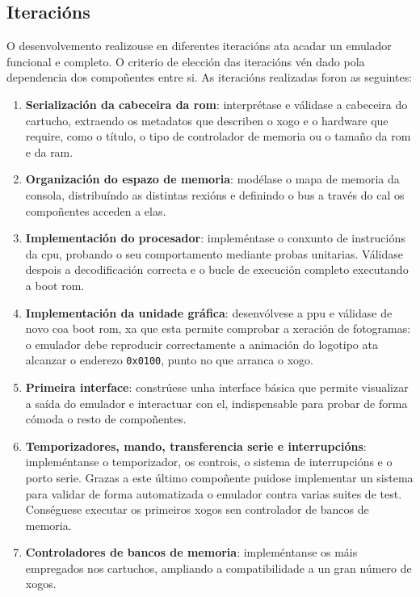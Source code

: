 \subsection{Iteracións}
O desenvolvemento realizouse en diferentes iteracións ata acadar un emulador funcional e completo.
O criterio de elección das iteracións vén dado pola dependencia dos compoñentes entre si.
As iteracións realizadas foron as seguintes:
\begin{enumerate}
    \item \textbf{Serialización da cabeceira da \acrshort{rom}}: interprétase e válidase a cabeceira do cartucho,
    extraendo os metadatos que describen o xogo e o hardware que require, como o título,
    o tipo de controlador de memoria ou o tamaño da \acrshort{rom} e da \acrshort{ram}.
    \item \textbf{Organización do espazo de memoria}: modélase o mapa de memoria da consola,
    distribuíndo as distintas rexións e definindo o bus a través do cal os compoñentes acceden a elas.
    \item \textbf{Implementación do procesador}: impleméntase o conxunto de instrucións da \acrfull{cpu},
    probando o seu comportamento mediante probas unitarias.
    Válidase despois a decodificación correcta e o bucle de execución completo executando a boot \acrshort{rom}.
    \item \textbf{Implementación da unidade gráfica}: desenvólvese a \acrfull{ppu} e válidase de novo coa boot \acrshort{rom},
     xa que esta permite comprobar a xeración de fotogramas: 
     o emulador debe reproducir correctamente a animación do logotipo ata 
     alcanzar o enderezo \texttt{0x0100}, punto no que arranca o xogo.
    \item \textbf{Primeira interface}: constrúese unha interface básica que permite visualizar
    a saída do emulador e interactuar con el,
    indispensable para probar de forma cómoda o resto de compoñentes.
    \item \textbf{Temporizadores, mando, transferencia serie e interrupcións}: impleméntanse o temporizador, 
    os controis, o sistema de interrupcións e o porto serie. Grazas a este último compoñente
    puidose implementar un sistema para validar de forma automatizada o emulador 
    contra varias suites de test.
    Conséguese executar os primeiros xogos sen controlador de bancos de memoria.
    \item \textbf{Controladores de bancos de memoria}: impleméntanse os 
     máis empregados nos cartuchos, ampliando a compatibilidade a un gran número de xogos.

\end{enumerate}
